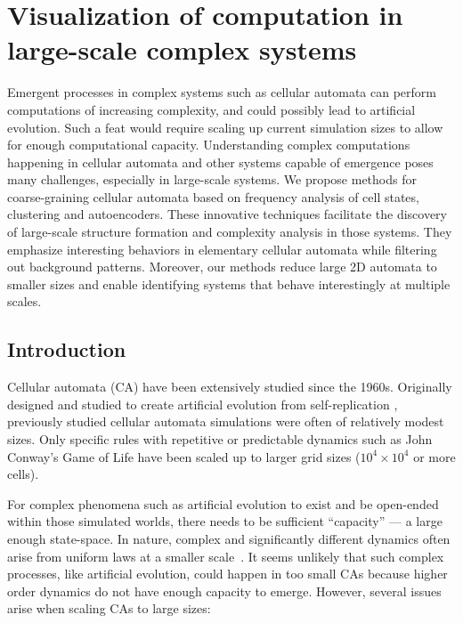 \chapter{Visualization of computation in large-scale complex systems}
\label{cha:visu-comp-large}

  Emergent processes in complex systems such as cellular automata can perform
  computations of increasing complexity, and could possibly lead to artificial
  evolution. Such a feat would require scaling up current simulation sizes to
  allow for enough computational capacity. Understanding complex computations
  happening in cellular automata and other systems capable of emergence poses
  many challenges, especially in large-scale systems. We propose methods for
  coarse-graining cellular automata based on frequency analysis of cell states,
  clustering and autoencoders. These innovative techniques facilitate the
  discovery of large-scale structure formation and complexity analysis in those
  systems. They emphasize interesting behaviors in elementary cellular automata
  while filtering out background patterns. Moreover, our methods reduce large 2D
  automata to smaller sizes and enable identifying systems that behave
  interestingly at multiple scales.

\section{Introduction}
Cellular automata (CA) have been extensively studied since the 1960s. Originally
designed and studied to create artificial evolution from self-replication
\cite{vonneumannTheorySelfreproducingAutomata1966,
  langtonSelfreproductionCellularAutomata1984}, previously studied cellular
automata simulations were often of relatively modest sizes. Only specific rules
with repetitive or predictable dynamics such as John Conway's Game of Life
\cite{gardnerMathematicalGames1970} have been scaled up to larger grid sizes
($10^4 \times 10^4$ or more cells).

For complex phenomena such as artificial evolution to exist and be open-ended
within those simulated worlds, there needs to be sufficient ``capacity'' --- a
large enough state-space. In nature, complex and significantly different
dynamics often arise from uniform laws at a smaller
scale~\cite{andersonMoreDifferent1972}. It seems unlikely that such complex
processes, like artificial evolution, could happen in too small CAs because
higher order dynamics do not have enough capacity to emerge. However, several
issues arise when scaling CAs to large sizes:

